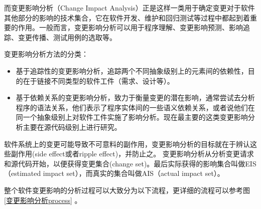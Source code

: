 而变更影响分析（Change Impact Analysis）正是这样一类用于确定变更对于软件其他部分的影响的技术集合\cite{li2013survey}，它在软件开发、维护和回归测试等过程中都起到着重要的作用\cite{acharya2011practical}。一般而言，变更影响分析可以用于程序理解、变更影响预测、影响追踪、变更传播、测试用例的选取等。

变更影响分析方法的分类：
\begin{itemize}
	\item 基于追踪性的变更影响分析\cite{de2008traceability}，追踪两个不同抽象级别上的元素间的依赖性，目的在于链接不同类型的软件工件（需求、设计等）。

	\item 基于依赖关系的变更影响分析\cite{law2003incremental}，致力于衡量变更的潜在影响，通常尝试去分析程序的语法关系，他们表示了程序实体间的一些语义依赖关系，或者说他们在同一个抽象级别上对软件工件实施了影响分析。现在最主要的这类变更影响分析主要在源代码级别上进行研究。
\end{itemize}

软件系统上的变更可能导致不可意料的副作用，变更影响分析的目标就在于辨认这些副作用(side effect或者ripple effect)\cite{bohner1996software}，并防止之。
变更影响分析从分析变更请求和源代码开始，以便获得变更集合(change set)。最后实际获得的影响集合叫做EIS（estimated impact set），而真实的集合叫做AIS（actual impact set）。

整个软件变更影响的分析过程可以大致分为以下流程，更详细的流程可以参考图\ref {变更影响分析process} \cite{de2008traceability,bohner2002software}。

